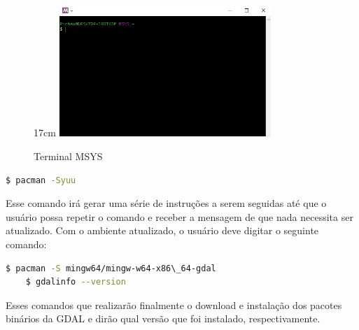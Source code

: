  \begin{figure}[!ht]{17cm}
 	\centering
 	\includegraphics[width=8cm]{Figuras/terminalgdal.jpg}
 	\caption{Terminal MSYS} \label{fig:terminalgdal}
 \end{figure}
 
 \begin{lstlisting}[language=bash]
 	$ pacman -Syuu
 \end{lstlisting}

 Esse comando irá gerar uma série de instruções a serem seguidas até que o usuário possa repetir o comando e receber a mensagem de que nada necessita ser atualizado. Com o ambiente atualizado, o usuário deve digitar o seguinte comando:
  \begin{lstlisting}[language=bash]
 	$ pacman -S mingw64/mingw-w64-x86\_64-gdal
 	$ gdalinfo --version
 \end{lstlisting}

 Esses comandos que realizarão finalmente o download e instalação dos pacotes binários da GDAL e dirão qual versão que foi instalado, respectivamente. 
 
